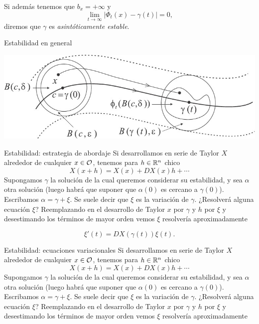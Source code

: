  Si además tenemos que $b_x=+\infty$ y
 \[\lim_{t\to\infty}|\Phi_t(x)-\gamma(t)|=0, \]
 diremos que $\gamma$ es \emph{asintóticamente estable}.


  
 

 




{Estabilidad en general}
 
   \begin{center}
   \includegraphics[scale=0.4]{imagenes/estabilidad_gral.jpg}
   \end{center}





{Estabilidad: estrategia de abordaje }
 Si desarrollamos en serie de Taylor $X$ alrededor de cualquier $x\in\mathcal{O}$, tenemos para $h\in\mathbb{R}^n$ chico
 \[X(x+h)=X(x)+DX(x)h+\cdots\]
Supongamos $\gamma$ la solución de la cual queremos considerar su estabilidad, y sea $\alpha$ otra solución 
(luego habrá que suponer que $\alpha(0)$ es cercano a $\gamma(0)$). Escribamos $\alpha=\gamma+\xi$. Se suele
decir que $\xi$ es la variación de $\gamma$. ¿Resolverá alguna ecuación $\xi$? Reemplazando en el desarrollo de Taylor
$x$ por $\gamma$ y $h$ por $\xi$ y desestimando los términos de mayor orden vemos $\xi$ resolvería aproximadamente

\[\xi'(t)=DX(\gamma(t))\xi(t).\]




{Estabilidad: ecuaciones variacionales}
 Si desarrollamos en serie de Taylor $X$ alrededor de cualquier $x\in\mathcal{O}$, tenemos para $h\in\mathbb{R}^n$ chico
 \[X(x+h)=X(x)+DX(x)h+\cdots\]
Supongamos $\gamma$ la solución de la cual queremos considerar su estabilidad, y sea $\alpha$ otra solución 
(luego habrá que suponer que $\alpha(0)$ es cercano a $\gamma(0)$). Escribamos $\alpha=\gamma+\xi$. Se suele
decir que $\xi$ es la variación de $\gamma$. ¿Resolverá alguna ecuación $\xi$? Reemplazando en el desarrollo de Taylor
$x$ por $\gamma$ y $h$ por $\xi$ y desestimando los términos de mayor orden vemos $\xi$ resolvería aproximadamente

